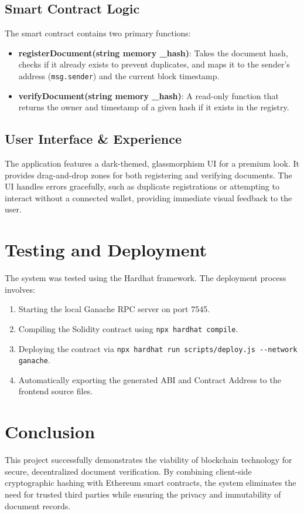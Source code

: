 \documentclass[12pt, a4paper]{article}
\begin{document}
\subsection{Smart Contract Logic}
The smart contract contains two primary functions:
\begin{itemize}
    \item \textbf{registerDocument(string memory \_hash)}: Takes the document hash, checks if it already exists to prevent duplicates, and maps it to the sender's address (\texttt{msg.sender}) and the current block timestamp.
    \item \textbf{verifyDocument(string memory \_hash)}: A read-only function that returns the owner and timestamp of a given hash if it exists in the registry.
\end{itemize}

\subsection{User Interface \& Experience}
The application features a dark-themed, glassmorphism UI for a premium look. It provides drag-and-drop zones for both registering and verifying documents. The UI handles errors gracefully, such as duplicate registrations or attempting to interact without a connected wallet, providing immediate visual feedback to the user.

\section{Testing and Deployment}
The system was tested using the Hardhat framework. The deployment process involves:
\begin{enumerate}
    \item Starting the local Ganache RPC server on port 7545.
    \item Compiling the Solidity contract using \texttt{npx hardhat compile}.
    \item Deploying the contract via \texttt{npx hardhat run scripts/deploy.js -{}-network ganache}.
    \item Automatically exporting the generated ABI and Contract Address to the frontend source files.
\end{enumerate}

\section{Conclusion}
This project successfully demonstrates the viability of blockchain technology for secure, decentralized document verification. By combining client-side cryptographic hashing with Ethereum smart contracts, the system eliminates the need for trusted third parties while ensuring the privacy and immutability of document records.
\end{document}
